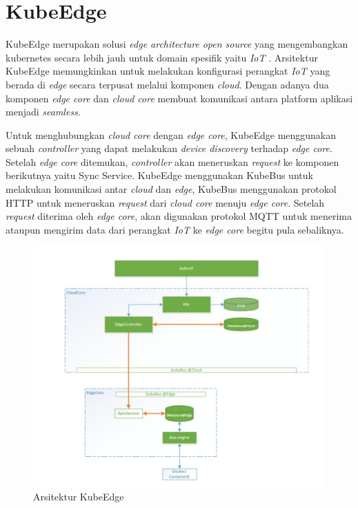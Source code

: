 \section{KubeEdge}

KubeEdge merupakan solusi \textit{edge architecture} \textit{open source} yang mengembangkan kubernetes secara lebih jauh untuk domain spesifik yaitu \textit{IoT} \parencite{kubeedge}. Arsitektur KubeEdge memungkinkan untuk melakukan konfigurasi perangkat \textit{IoT} yang berada di \textit{edge} secara terpusat melalui komponen \textit{cloud}. Dengan adanya dua komponen \textit{edge core} dan \textit{cloud core} membuat komunikasi antara platform aplikasi menjadi \textit{seamless}.

Untuk menghubungkan \textit{cloud core} dengan \textit{edge core}, KubeEdge menggunakan sebuah \textit{controller} yang dapat melakukan \textit{device discovery} terhadap \textit{edge core}. Setelah \textit{edge core} ditemukan, \textit{controller} akan meneruskan \textit{request} ke komponen berikutnya yaitu Sync Service. KubeEdge menggunakan KubeBus untuk melakukan komunikasi antar \textit{cloud} dan \textit{edge}, KubeBus menggunakan protokol HTTP untuk meneruskan \textit{request} dari \textit{cloud core} menuju \textit{edge core}. Setelah \textit{request} diterima oleh \textit{edge core}, akan digunakan protokol MQTT untuk menerima ataupun mengirim data dari perangkat \textit{IoT} ke \textit{edge core} begitu pula sebaliknya.

\begin{figure}
  \centering
  \includegraphics[width=1\textwidth]{resources/chapter-2/arsitektur-kube-edge.jpg}
  \caption{Arsitektur KubeEdge \parencite{kubeedge}}
  \label{fig:arsitektur-kube-edge}
\end{figure}